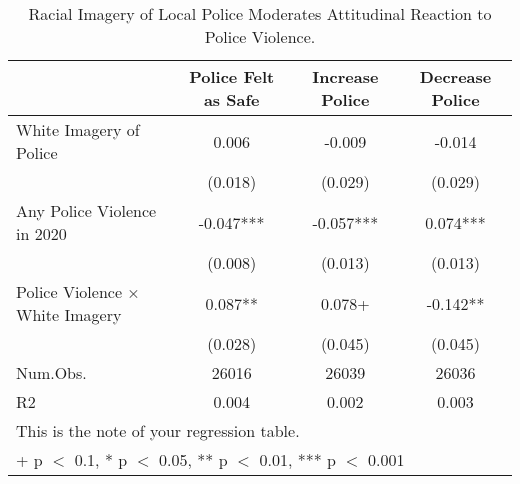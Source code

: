 \begin{table}

\caption{Racial Imagery of Local Police Moderates Attitudinal Reaction to Police Violence.}
\centering
\begin{tabular}[t]{lccc}
\toprule
  & Police Felt as Safe & Increase Police & Decrease Police\\
\midrule
White Imagery of Police & 0.006 & -0.009 & -0.014\\
 & (0.018) & (0.029) & (0.029)\\
Any Police Violence in 2020 & -0.047*** & -0.057*** & 0.074***\\
 & (0.008) & (0.013) & (0.013)\\
Police Violence × White Imagery & 0.087** & 0.078+ & -0.142**\\
 & (0.028) & (0.045) & (0.045)\\
\midrule
Num.Obs. & 26016 & 26039 & 26036\\
R2 & 0.004 & 0.002 & 0.003\\
\bottomrule
\multicolumn{4}{l}{\rule{0pt}{1em}This is the note of your regression table.}\\
\multicolumn{4}{l}{\rule{0pt}{1em}+ p $<$ 0.1, * p $<$ 0.05, ** p $<$ 0.01, *** p $<$ 0.001}\\
\end{tabular}
\end{table}
